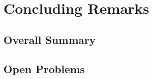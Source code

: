 \chapter{Concluding Remarks} \label{chapter:conclusions}

\section{Overall Summary}

\section{Open Problems}
